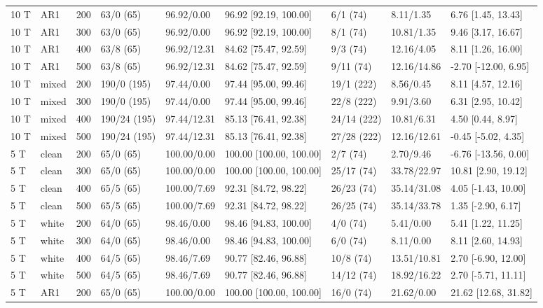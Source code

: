 \documentclass[10pt]{article}
\begin{document}
\begin{longtable}{@{}lllllllll@{}}
10 T & AR1 & 200 & 63/0 (65) & 96.92/0.00 & 96.92 [92.19, 100.00] & 6/1 (74) & 8.11/1.35 & 6.76 [1.45, 13.43] \\
10 T & AR1 & 300 & 63/0 (65) & 96.92/0.00 & 96.92 [92.19, 100.00] & 8/1 (74) & 10.81/1.35 & 9.46 [3.17, 16.67] \\
10 T & AR1 & 400 & 63/8 (65) & 96.92/12.31 & 84.62 [75.47, 92.59] & 9/3 (74) & 12.16/4.05 & 8.11 [1.26, 16.00] \\
10 T & AR1 & 500 & 63/8 (65) & 96.92/12.31 & 84.62 [75.47, 92.59] & 9/11 (74) & 12.16/14.86 & -2.70 [-12.00, 6.95] \\
10 T & mixed & 200 & 190/0 (195) & 97.44/0.00 & 97.44 [95.00, 99.46] & 19/1 (222) & 8.56/0.45 & 8.11 [4.57, 12.16] \\
10 T & mixed & 300 & 190/0 (195) & 97.44/0.00 & 97.44 [95.00, 99.46] & 22/8 (222) & 9.91/3.60 & 6.31 [2.95, 10.42] \\
10 T & mixed & 400 & 190/24 (195) & 97.44/12.31 & 85.13 [76.41, 92.38] & 24/14 (222) & 10.81/6.31 & 4.50 [0.44, 8.97] \\
10 T & mixed & 500 & 190/24 (195) & 97.44/12.31 & 85.13 [76.41, 92.38] & 27/28 (222) & 12.16/12.61 & -0.45 [-5.02, 4.35] \\
5 T & clean & 200 & 65/0 (65) & 100.00/0.00 & 100.00 [100.00, 100.00] & 2/7 (74) & 2.70/9.46 & -6.76 [-13.56, 0.00] \\
5 T & clean & 300 & 65/0 (65) & 100.00/0.00 & 100.00 [100.00, 100.00] & 25/17 (74) & 33.78/22.97 & 10.81 [2.90, 19.12] \\
5 T & clean & 400 & 65/5 (65) & 100.00/7.69 & 92.31 [84.72, 98.22] & 26/23 (74) & 35.14/31.08 & 4.05 [-1.43, 10.00] \\
5 T & clean & 500 & 65/5 (65) & 100.00/7.69 & 92.31 [84.72, 98.22] & 26/25 (74) & 35.14/33.78 & 1.35 [-2.90, 6.17] \\
5 T & white & 200 & 64/0 (65) & 98.46/0.00 & 98.46 [94.83, 100.00] & 4/0 (74) & 5.41/0.00 & 5.41 [1.22, 11.25] \\
5 T & white & 300 & 64/0 (65) & 98.46/0.00 & 98.46 [94.83, 100.00] & 6/0 (74) & 8.11/0.00 & 8.11 [2.60, 14.93] \\
5 T & white & 400 & 64/5 (65) & 98.46/7.69 & 90.77 [82.46, 96.88] & 10/8 (74) & 13.51/10.81 & 2.70 [-6.90, 12.00] \\
5 T & white & 500 & 64/5 (65) & 98.46/7.69 & 90.77 [82.46, 96.88] & 14/12 (74) & 18.92/16.22 & 2.70 [-5.71, 11.11] \\
5 T & AR1 & 200 & 65/0 (65) & 100.00/0.00 & 100.00 [100.00, 100.00] & 16/0 (74) & 21.62/0.00 & 21.62 [12.68, 31.82] \\

\end{longtable}
\end{document}

